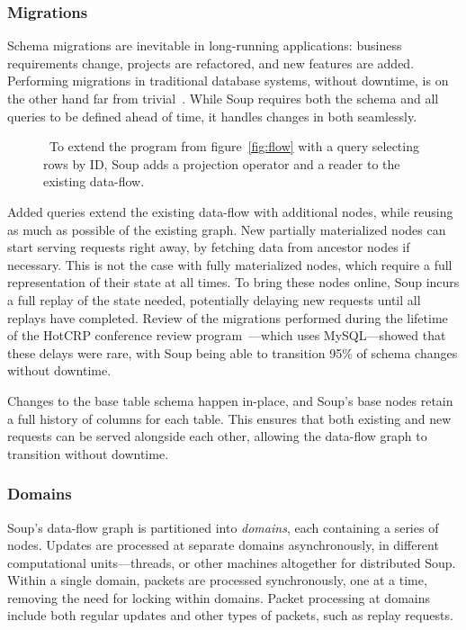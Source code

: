\subsubsection{Migrations}

Schema migrations are inevitable in long-running applications: business
requirements change, projects are refactored, and new features are added.
Performing migrations in traditional database systems, without downtime, is on
the other hand far from trivial~\cite{stripe, gh-ost}. While Soup requires both
the schema and all queries to be defined ahead of time, it handles changes in
both seamlessly.

\begin{figure}[H]
  \centering
  
  \caption{\
    To extend the program from figure~\ref{fig:flow} with a
    query selecting rows by ID, Soup adds a projection operator and a reader to
    the existing data-flow.
  }\label{fig:migrate}
\end{figure}

Added queries extend the existing data-flow with additional nodes, while
reusing as much as possible of the existing graph. New partially materialized
nodes can start serving requests right away, by fetching data from ancestor
nodes if necessary. This is not the case with fully materialized nodes, which
require a full representation of their state at all times. To bring these nodes
online, Soup incurs a full replay of the state needed, potentially delaying new
requests until all replays have completed. Review of the migrations performed
during the lifetime of the HotCRP conference review
program~\cite{hotcrp}---which uses MySQL---showed that these delays were rare,
with Soup being able to transition 95\% of schema changes without downtime.

Changes to the base table schema happen in-place, and Soup's base nodes retain a
full history of columns for each table. This ensures that both existing and new
requests can be served alongside each other, allowing the data-flow graph to
transition without downtime.

\subsubsection{Domains}

Soup's data-flow graph is partitioned into \textit{domains}, each containing a
series of nodes. Updates are processed at separate domains asynchronously, in
different computational units---threads, or other machines altogether for
distributed Soup. Within a single domain, packets are processed synchronously,
one at a time, removing the need for locking within domains. Packet processing
at domains include both regular updates and other types of packets, such as
replay requests.

